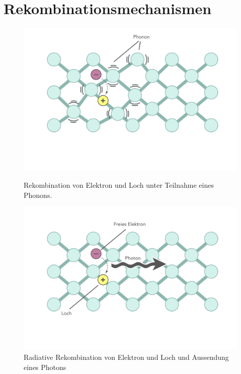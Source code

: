 
\thispagestyle{fancy}


\section{Rekombinationsmechanismen}

\begin{figure}[htb]
    \centering
    \begin{minipage}[t]{0.49\linewidth}
        \centering
        \includegraphics[width=\linewidth]{Bilder/nonradRekomb.pdf}
        \caption{Rekombination von Elektron und Loch unter Teilnahme eines Phonons.}
    \end{minipage}%
    \hfill
    \begin{minipage}[t]{0.49\linewidth}
        \centering
        \includegraphics[width=\linewidth]{Bilder/radRekomb.pdf}
        \caption{Radiative Rekombination von Elektron und Loch und Aussendung eines Photons}
    \end{minipage}
\end{figure}
